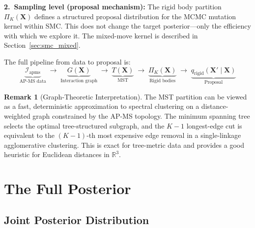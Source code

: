 \documentclass[11pt,a4paper]{article}
\newcommand{\bX}{\mathbf{X}}
\newcommand{\R}{\mathbb{R}}
\theoremstyle{definition}
\newtheorem{remark}{Remark}
\begin{document}
\textbf{2.\ Sampling level (proposal mechanism):}
The rigid body partition $\Pi_K(\bX)$ defines a structured proposal distribution for the MCMC mutation kernel within SMC. This does not change the target posterior---only the efficiency with which we explore it. The mixed-move kernel is described in Section~\ref{sec:smc_mixed}.

The full pipeline from data to proposal is:
\begin{equation}
    \underbrace{\mathcal{I}_{\text{apms}}}_{\text{AP-MS data}} \;\longrightarrow\;
    \underbrace{G(\bX)}_{\text{Interaction graph}} \;\longrightarrow\;
    \underbrace{T(\bX)}_{\text{MST}} \;\longrightarrow\;
    \underbrace{\Pi_K(\bX)}_{\text{Rigid bodies}} \;\longrightarrow\;
    \underbrace{q_{\text{rigid}}(\bX' \mid \bX)}_{\text{Proposal}}
    \label{eq:mst_pipeline}
\end{equation}

\begin{remark}[Graph-Theoretic Interpretation]
The MST partition can be viewed as a fast, deterministic approximation to spectral clustering on a distance-weighted graph constrained by the AP-MS topology.  The minimum spanning tree selects the optimal tree-structured subgraph, and the $K-1$ longest-edge cut is equivalent to the $(K-1)$-th most expensive edge removal in a single-linkage agglomerative clustering.  This is exact for tree-metric data and provides a good heuristic for Euclidean distances in $\R^3$.
\end{remark}

\section{The Full Posterior}

\subsection{Joint Posterior Distribution}
\end{document}
